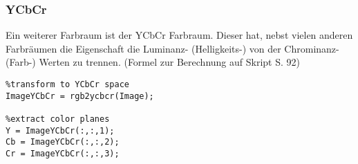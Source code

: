 \subsubsection{YCbCr}
Ein weiterer Farbraum ist der YCbCr Farbraum. Dieser hat, nebst vielen anderen Farbräumen die Eigenschaft die Luminanz- (Helligkeits-) von der Chrominanz- (Farb-) Werten zu trennen. (Formel zur Berechnung auf Skript S. 92)
\begin{lstlisting}
%transform to YCbCr space
ImageYCbCr = rgb2ycbcr(Image);

%extract color planes
Y = ImageYCbCr(:,:,1);
Cb = ImageYCbCr(:,:,2);
Cr = ImageYCbCr(:,:,3);
\end{lstlisting}